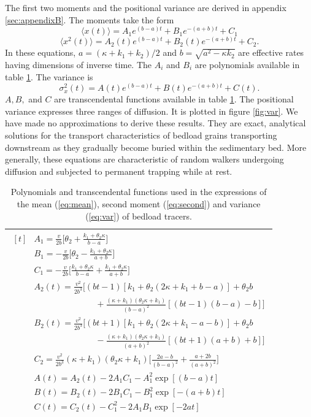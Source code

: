 \documentclass[]{agujournal2018}
\newcommand\be{\begin{equation}}
\newcommand\ee{\end{equation}}
\newcommand\bra{\langle}
\newcommand\ket{\rangle}
\begin{document}
\noindent The first two moments and the positional variance are derived in appendix \ref{sec:appendixB}. 
The moments take the form
\be \bra x(t) \ket = A_1 e^{(b-a)t}+B_1e^{-(a+b)t}+C_1 \label{eq:mean}\ee
\be \bra x^2(t) \ket = A_2(t)e^{(b-a)t}+B_2(t)e^{-(a+b)t}+C_2. \label{eq:second}\ee
In these equations, $a = (\kappa + k_1+k_2)/2$ and $b = \sqrt{a^2-\kappa k_2}$ are effective rates having dimensions of inverse time.
The $A_i$ and $B_i$ are polynomials available in table \ref{table:params}.
The variance is
\be \sigma_x^2(t) = A(t)e^{(b-a)t} + B(t)e^{-(a+b)t} + C(t). \label{eq:var}\ee
$A, B,$ and $C$ are transcendental functions available in table \ref{table:params}.
The positional variance expresses three ranges of diffusion. It is plotted in figure \ref{fig:var}. 
We have made no approximations to derive these results. They are exact, analytical solutions for the transport characteristics of bedload grains transporting downstream as they gradually become buried within the sedimentary bed. More generally, these equations are characteristic of random walkers undergoing diffusion and subjected to permanent trapping while at rest.
\begin{table}[!h]
	\centering
	\caption{Polynomials and transcendental functions used in the expressions of the mean (\ref{eq:mean}), second moment (\ref{eq:second}) and variance (\ref{eq:var}) of bedload tracers.}
	\label{table:params}
	\begin{tabular}{c}
		\toprule
		$\begin{aligned}[t]
		&A_1 = \frac{v}{2b}\big[\theta_2+\frac{k_1+\theta_2\kappa}{b-a}\big] \\
		&B_1 = -\frac{v}{2b}\big[\theta_2-\frac{k_1+\theta_2 \kappa}{a+b}\big] \\
		&C_1 =  -\frac{v}{2b}\big[\frac{k_1+\theta_2 \kappa}{b-a}+\frac{k_1+\theta_2 \kappa}{a+b}\big]\\
		&A_2(t) = \frac{v^2}{2b^3}\Big[(bt-1)[k_1+\theta_2(2\kappa + k_1 + b-a)]+\theta_2b \\
		&\hspace{3cm} + \frac{(\kappa+k_1)(\theta_2\kappa+k_1)}{(b-a)^2}[(bt-1)(b-a)-b]\Big]\\
		&B_2(t) = \frac{v^2}{2b^3}\Big[(bt+1)[k_1 + \theta_2(2\kappa+k_1-a-b)]+\theta_2b\\
		&\hspace{3cm} -\frac{(\kappa+k_1)(\theta_2\kappa+k_1)}{(a+b)^2}[(bt+1)(a+b)+b]\Big]\\
		&C_2 = \frac{v^2}{2b^3}(\kappa+k_1)(\theta_2 \kappa + k_1)\Big[\frac{2a-b}{(b-a)^2}+\frac{a+2b}{(a+b)^2}\Big]\\
		&A(t) = A_2(t)-2A_1C_1 - A_1^2\exp[(b-a)t]\\
		&B(t) = B_2(t)-2B_1C_1 - B_1^2\exp[-(a+b)t]\\
		&C(t) = C_2(t)-C_1^2-2A_1B_1\exp[-2at]\\			
		\end{aligned}$\\
		\bottomrule
	\end{tabular}
\end{table}
\end{document}
